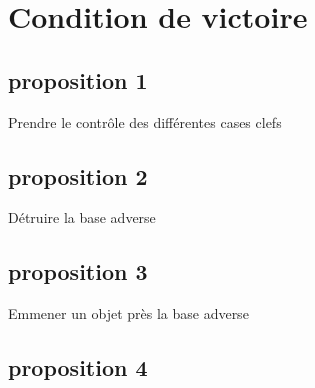 \documentclass[10pt]{article}
\begin{document}
\section{Condition de victoire}

\subsection{proposition 1}

Prendre le contrôle des différentes cases clefs

\subsection{proposition 2}

Détruire la base adverse

\subsection{proposition 3}

Emmener un objet près la base adverse

\subsection{proposition 4}
\end{document}

